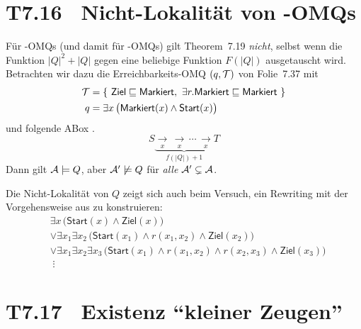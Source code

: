 \documentclass[fontsize=11pt, twoside=false, numbers=autoenddot]{scrbook}
\begin{document}
\enlargethispage{12mm}
\section*{T7.16~ {\boldmath Nicht-Lokalität von \EL-OMQs}}

Für \EL-OMQs (und damit für \ALC-OMQs) gilt Theorem~7.19 \emph{nicht},
selbst wenn die Funktion $|Q|^2+|Q|$ gegen eine beliebige Funktion
$F(|Q|)$ ausgetauscht wird. Betrachten wir dazu die Erreichbarkeits-OMQ
$(q,\mathcal{T})$ von Folie~7.37 mit
%
\begin{align*}
  \mathcal{T} & = \{~  \textsf{Ziel} \sqsubseteq \textsf{Markiert},~ \exists r.\textsf{Markiert} \sqsubseteq \textsf{Markiert} ~\} \\
  q    & = \exists x \, \big(\textsf{Markiert}(x) \wedge \textsf{Start}(x)\big)
\end{align*}
%
und folgende ABox \Amc.
\vspace*{-\baselineskip}
\[
  S \mathrel{\underbrace{\underset{x}{\longrightarrow}\, \underset{x}{\longrightarrow} \,\cdots\, \underset{x}{\longrightarrow}}_{f(|Q|)+1}} T
\]
Dann gilt $\mathcal{A} \models Q$, aber $\mathcal{A}' \not\models Q$
für \emph{alle} $\mathcal{A}' \subsetneq \mathcal{A}$.

\parII
Die Nicht-Lokalität von $Q$ zeigt sich auch beim Versuch,
ein Rewriting mit der Vorgehensweise aus
\textsf{\hyperlink{BspRewriting}{\BspRewriting}} zu konstruieren:
%
\begin{align*}
  & \exists x\,\big(\textsf{Start}(x) \land \textsf{Ziel}(x)\big) \\
  & \lor \exists x_1\exists x_2\,\big(\textsf{Start}(x_1) \land r(x_1,x_2) \land \textsf{Ziel}(x_2)\big) \\
  & \lor \exists x_1\exists x_2\exists x_3\,\big(\textsf{Start}(x_1) \land r(x_1,x_2) \land r(x_2,x_3) \land \textsf{Ziel}(x_3)\big) \\[-4pt]
  & \;\vdots
\end{align*}

\section*{T7.17~ {\boldmath Existenz "`kleiner Zeugen"'}}
\end{document}
